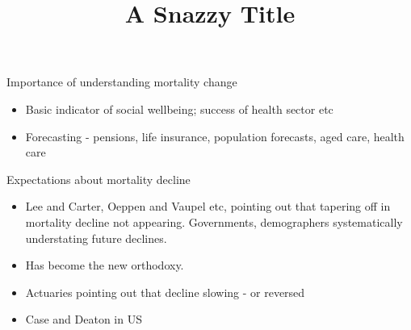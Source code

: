 \documentclass[11pt]{article}\usepackage[]{graphicx}\usepackage[]{color}
\title{A Snazzy Title}
\author{}
\date{}
\begin{document}
\maketitle








Importance of understanding mortality change
\begin{itemize}
  \item Basic indicator of social wellbeing; success of health sector etc
  \item Forecasting - pensions, life insurance, population forecasts, aged care, health care
\end{itemize}

Expectations about mortality decline
\begin{itemize}
    \item Lee and Carter, Oeppen and Vaupel etc, pointing out that tapering off in mortality decline not appearing. Governments, demographers systematically understating future declines. 
    \item Has become the new orthodoxy.
    \item Actuaries pointing out that decline slowing - or reversed
    \item Case and Deaton in US
 \end{itemize}
\end{document}
